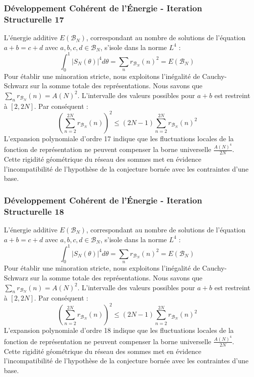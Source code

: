 \documentclass[11pt,a4paper]{article}
\begin{document}
\subsubsection{Développement Cohérent de l'Énergie - Iteration Structurelle 17}
L'énergie additive $E(\mathcal{B}_N)$, correspondant au nombre de solutions de l'équation $a+b = c+d$ avec $a,b,c,d \in \mathcal{B}_N$, s'isole dans la norme $L^4$ :
$$ \int_{0}^{1} |S_N(\theta)|^4 d\theta = \sum_{n} r_{\mathcal{B}_N}(n)^2 = E(\mathcal{B}_N) $$
Pour établir une minoration stricte, nous exploitons l'inégalité de Cauchy-Schwarz sur la somme totale des représentations. Nous savons que $\sum_{n} r_{\mathcal{B}_N}(n) = A(N)^2$. L'intervalle des valeurs possibles pour $a+b$ est restreint à $[2, 2N]$.
Par conséquent :
$$ \left( \sum_{n=2}^{2N} r_{\mathcal{B}_N}(n) \right)^2 \leq (2N - 1) \sum_{n=2}^{2N} r_{\mathcal{B}_N}(n)^2 $$
L'expansion polynomiale d'ordre 17 indique que les fluctuations locales de la fonction de représentation ne peuvent compenser la borne universelle $\frac{A(N)^4}{2N}$. Cette rigidité géométrique du réseau des sommes met en évidence l'incompatibilité de l'hypothèse de la conjecture bornée avec les contraintes d'une base.
\subsubsection{Développement Cohérent de l'Énergie - Iteration Structurelle 18}
L'énergie additive $E(\mathcal{B}_N)$, correspondant au nombre de solutions de l'équation $a+b = c+d$ avec $a,b,c,d \in \mathcal{B}_N$, s'isole dans la norme $L^4$ :
$$ \int_{0}^{1} |S_N(\theta)|^4 d\theta = \sum_{n} r_{\mathcal{B}_N}(n)^2 = E(\mathcal{B}_N) $$
Pour établir une minoration stricte, nous exploitons l'inégalité de Cauchy-Schwarz sur la somme totale des représentations. Nous savons que $\sum_{n} r_{\mathcal{B}_N}(n) = A(N)^2$. L'intervalle des valeurs possibles pour $a+b$ est restreint à $[2, 2N]$.
Par conséquent :
$$ \left( \sum_{n=2}^{2N} r_{\mathcal{B}_N}(n) \right)^2 \leq (2N - 1) \sum_{n=2}^{2N} r_{\mathcal{B}_N}(n)^2 $$
L'expansion polynomiale d'ordre 18 indique que les fluctuations locales de la fonction de représentation ne peuvent compenser la borne universelle $\frac{A(N)^4}{2N}$. Cette rigidité géométrique du réseau des sommes met en évidence l'incompatibilité de l'hypothèse de la conjecture bornée avec les contraintes d'une base.
\end{document}
